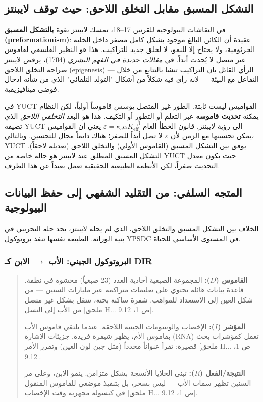 \documentclass[12pt,a4paper]{article}
\begin{document}
	\subsection{التشكل المسبق مقابل التخلق اللاحق: حيث توقف لايبنتز}
	
	في النقاشات البيولوجية للقرنين 17–18، تمسك لايبنتز بقوة \textbf{بالتشكل المسبق (preformationism)}: عقيدة أن الكائن البالغ موجود بشكل كامل مصغر داخل الخلية الجرثومية، ولا يحتاج إلا للنمو، لا لخلق جديد للتراكيب. هذا هو النظير الفلسفي لقاموس غير متصل لا يُحدث أبداً. في \emph{مقالات جديدة في الفهم البشري} (1704)، يرفض لايبنتز صراحة التخلق اللاحق (epigenesis) — الرأي القائل بأن التراكيب تنشأ بالتتابع من خلال التفاعل مع البيئة — لأنه رأى فيه شكلاً من أشكال "التولد التلقائي" الذي من شأنه إدخال فوضى ميتافيزيقية.
	
	في YUCT القواميس ليست ثابتة. الطور غير المتصل يؤسس قاموساً أولياً، لكن النظام يمكنه \textbf{تحديث قاموسه} عبر التعلم أو التطور أو التكيف. هذا هو البعد \emph{التخلقي اللاحق} الذي تضيفه YUCT إلى رؤية لايبنتز. قانون الخطأ العام \(\varepsilon = \kappa_c \alpha K_{\mathrm{eff}}^{-\beta}\) يعني أن القواميس يمكن تحسينها مع الزمن لأن \(\varepsilon\) لا تصل أبداً للصفر؛ هناك دائماً مجال للتحسين. وبالتالي، YUCT يوفق بين التشكل المسبق (القاموس الأولي) والتخلق اللاحق (تعديله لاحقاً). التشكل المسبق المطلق عند لايبنتز هو حالة خاصة من YUCT حيث يكون معدل التحديث صفراً، لكن الأنظمة الطبيعية الحقيقية تعمل بعيداً عن هذا الطرف.
	
	\subsection{المتجه السلفي: من التقليد الشفهي إلى حفظ البيانات البيولوجية}
	\label{subsec:ancestral-vector}
	
	الخلاف بين التشكل المسبق والتخلق اللاحق، الذي لم يحله لايبنتز، يجد حله التجريبي في بنية الوراثة. الطبيعة نفسها تنفذ بروتوكول YPSDC في المستوى الأساسي للحياة.
	
	\subsubsection{البروتوكول الجيني: الأب \(\to\) الابن كـ DIR}
	
	\begin{quote}
		\textbf{القاموس (\(D\)):} المجموعة الصبغية أحادية العدد (23 صبغياً) محشوة في نطفة. قاعدة بيانات هائلة تحتوي على تعليمات متراكمة عبر مليارات السنين — من شكل العين إلى الاستعداد للمواهب. شفرة ساكنة بحتة، تنتقل بشكل غير متصل من الأب إلى النسل [ملحق H... ص 1، 9.12].
		
		\textbf{المؤشر (\(I\)):} الإخصاب والوسومات الجينية اللاحقة. عندما يلتقي قاموس الأب بقاموس الأم، يظهر شيفرة فريدة. جزيئات الإشارة (RNA) تعمل كمؤشرات بحث قصيرة: تقرأ عنواناً محدداً (مثل جين لون العين) وتمرر الأمر [ملحق H... ص 1، 9.12].
		
		\textbf{النتيجة/الفعل (\(R\)):} تبنى الخلايا الأنسجة بشكل متزامن. ينمو الابن، وعلى مر السنين تظهر سمات الأب — ليس بسحر، بل بتنفيذ موضعي للقاموس المنقول في كبسولة مجهرية وقت الإخصاب [ملحق H... ص 1، 9.12].
	\end{quote}
	
\end{document}
